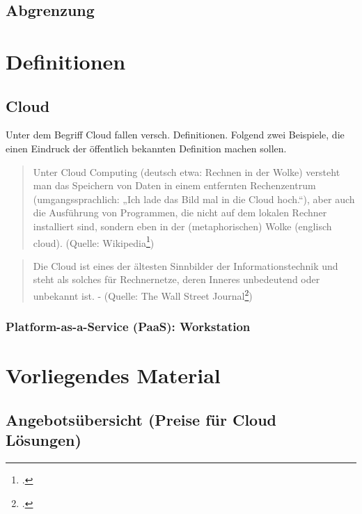 \subsection{Abgrenzung}



\section{Definitionen}

\subsection{Cloud}

Unter dem Begriff Cloud fallen versch. Definitionen. Folgend zwei Beispiele, die einen Eindruck der öffentlich bekannten Definition machen sollen.

\begin{quote}
	Unter Cloud Computing (deutsch etwa: Rechnen in der Wolke) versteht man das Speichern von Daten in einem entfernten Rechenzentrum (umgangssprachlich: „Ich lade das Bild mal in die Cloud hoch.“), aber auch die Ausführung von Programmen, die nicht auf dem lokalen Rechner installiert sind, sondern eben in der (metaphorischen) Wolke (englisch cloud). (Quelle: Wikipedia\footcite{Cloud_Computing__Wikipedia_2014-10-03})
\end{quote}


\begin{quote}
	Die Cloud ist eines der ältesten Sinnbilder der Informationstechnik und steht als solches für Rechnernetze, deren Inneres unbedeutend oder unbekannt ist. - (Quelle: The Wall Street Journal\footcite{The_Internet_Industry_Is_on_a_Cloud_--_Whatever_That_May_Mean_-_WSJ_2014-10-03})
\end{quote}






\subsubsection{Platform-as-a-Service (PaaS): Workstation}

\section{Vorliegendes Material}

\subsection{Angebotsübersicht (Preise für Cloud Lösungen)}
